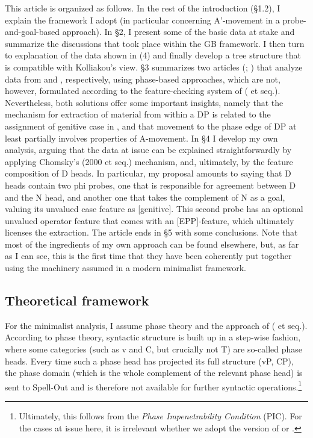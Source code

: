 \documentclass[output=paper]{langsci/langscibook}
\begin{document}
This article is organized as follows. In the rest of the introduction (§1.2), I explain the framework I adopt (in particular concerning A’-movement in a probe-and-goal-based approach). In §2, I present some of the basic data at stake and summarize the discussions that took place within the GB framework. I then turn to  explanation of the data shown in (4) and finally develop a tree structure that is compatible with Kolliakou’s view. §3 summarizes two articles (\citealt{Gutiérrez-Bravo2001}; \citealt{Cinque2014}) that analyze data from  and , respectively, using phase-based approaches, which are not, however, formulated according to the feature-checking system of \citeauthor{Chomsky2000} (\citeyear{Chomsky2000} et seq.). Nevertheless, both solutions offer some important insights, namely that the mechanism for extraction of material from within a DP is related to the assignment of genitive case in , and that movement to the phase edge of DP at least partially involves properties of A-movement. In §4 I develop my own analysis, arguing that the data at issue can be explained straightforwardly by applying Chomsky’s (2000 et seq.)  mechanism, and, ultimately, by the feature composition of  D heads. In particular, my proposal amounts to saying that D heads contain two phi probes, one that is responsible for agreement between D and the N head, and another one that takes the complement of N as a goal, valuing its unvalued case feature as [genitive]. This second probe has an optional unvalued operator feature that comes with an [EPP]-feature, which ultimately licenses the extraction. The article ends in §5 with some conclusions. Note that most of the ingredients of my own approach can be found elsewhere, but, as far as I can see, this is the first time that they have been coherently put together using the machinery assumed in a modern minimalist framework.

\subsection{Theoretical framework}%

For the minimalist analysis, I assume phase theory and the  approach of \citeauthor{Chomsky2000} (\citeyear{Chomsky2000} et seq.). According to phase theory, syntactic structure is built up in a step-wise fashion, where some categories (such as v and C, but crucially not T) are so-called phase heads. Every time such a phase head has projected its full structure (vP, CP), the phase domain (which is the whole complement of the relevant phase head) is sent to Spell-Out and is therefore not available for further syntactic operations.\footnote{Ultimately, this follows from the \textit{Phase Impenetrability Condition} (PIC). For the cases at issue here, it is irrelevant whether we adopt the version of \citet[108]{Chomsky2000} or \citet[13–14]{Chomsky2001Derivation}.}
\end{document}
